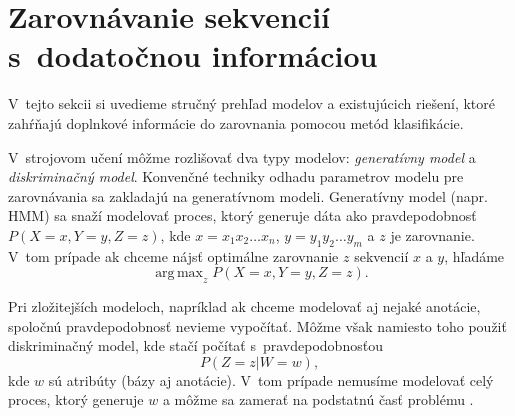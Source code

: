 \section[Zarov. s~dodat. info.]{Zarovnávanie sekvencií s~dodatočnou informáciou}
\label{section:other-work}

V~tejto sekcii si uvedieme stručný prehľad modelov a existujúcich riešení, ktoré zahŕňajú doplnkové informácie do zarovnania pomocou metód klasifikácie.

V~strojovom učení môžme rozlišovať dva typy modelov: \textit{generatívny model} a \textit{diskriminačný model}.
Konvenčné techniky odhadu parametrov modelu pre zarovnávania sa zakladajú na generatívnom modeli. Generatívny model (napr. HMM) sa snaží modelovať proces, ktorý generuje dáta ako pravdepodobnosť $P(X=x,Y=y,Z=z)$, kde $x = x_1x_2\dots x_n$, $y = y_1y_2\dots y_m$ a $z$ je zarovnanie. V~tom prípade ak chceme nájsť optimálne zarovnanie $z$ sekvencií $x$ a $y$, hľadáme
$$\operatorname{ arg\,max}_z P(X = x,Y = y,Z = z).$$

Pri zložitejších modeloch, napríklad ak chceme modelovať aj nejaké anotácie, spoločnú pravdepodobnosť nevieme vypočítať.
Môžme však namiesto toho použiť diskriminačný model, kde stačí počítať s~pravdepodobnosťou
$$P(Z=z|W=w),$$ kde $w$ sú atribúty (bázy aj anotácie). V~tom prípade nemusíme modelovať celý proces, ktorý generuje $w$ a môžme sa zamerať na podstatnú časť problému \cite{svmTrainingProteinsAlignment}.



